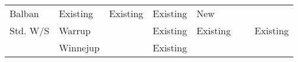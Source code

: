 \documentclass[version=last,
    paper=a4,                               %
    10pt,                                   %
    dvipsnames,
    oneside,                              %
    headings=openany,                       %
    open=any,
    BCOR=7mm,                               %
    DIV=15,     %
]{scrbook}
\begin{document}
\begin{longtable}[c]{@{}lllllll@{}}
\begin{minipage}[t]{0.12\columnwidth}
Balban
\end{minipage} & \begin{minipage}[t]{0.12\columnwidth}\raggedright
Existing
\end{minipage} & \begin{minipage}[t]{0.12\columnwidth}\raggedright
Existing
\end{minipage} & \begin{minipage}[t]{0.12\columnwidth}\raggedright
Existing
\end{minipage} & \begin{minipage}[t]{0.12\columnwidth}\raggedright
New
\end{minipage} & \begin{minipage}[t]{0.12\columnwidth}\raggedright
~
\end{minipage}
\\\addlinespace
\begin{minipage}[t]{0.12\columnwidth}\raggedright
Std. W/S
\end{minipage} & \begin{minipage}[t]{0.12\columnwidth}\raggedright
Warrup
\end{minipage} & \begin{minipage}[t]{0.12\columnwidth}\raggedright
~
\end{minipage} & \begin{minipage}[t]{0.12\columnwidth}\raggedright
Existing
\end{minipage} & \begin{minipage}[t]{0.12\columnwidth}\raggedright
Existing
\end{minipage} & \begin{minipage}[t]{0.12\columnwidth}\raggedright
~
\end{minipage} & \begin{minipage}[t]{0.12\columnwidth}\raggedright
Existing
\end{minipage}
\\\addlinespace
\begin{minipage}[t]{0.12\columnwidth}\raggedright
~
\end{minipage} & \begin{minipage}[t]{0.12\columnwidth}\raggedright
Winnejup
\end{minipage} & \begin{minipage}[t]{0.12\columnwidth}\raggedright
~
\end{minipage} & \begin{minipage}[t]{0.12\columnwidth}\raggedright
Existing
\end{minipage} & \begin{minipage}[t]{0.12\columnwidth}\raggedright

\end{minipage}
\end{longtable}
\end{document}
